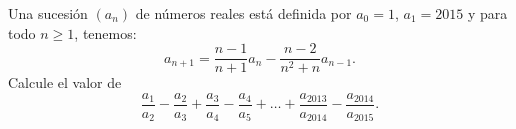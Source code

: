 Una sucesión $(a_n)$ de números reales está definida por $a_0=1$, $a_1=2015$ y para todo $n\geq1$, tenemos:
\[a_{n+1}=\frac{n-1}{n+1}a_n-\frac{n-2}{n^2+n}a_{n-1}. \]
Calcule el valor de
 $$\frac{a_1}{a_2}-\frac{a_2}{a_3}+\frac{a_3}{a_4}-\frac{a_4}{a_5}+\ldots+\frac{a_{2013}}{a_{2014}}-\frac{a_{2014}}{a_{2015}}.$$
